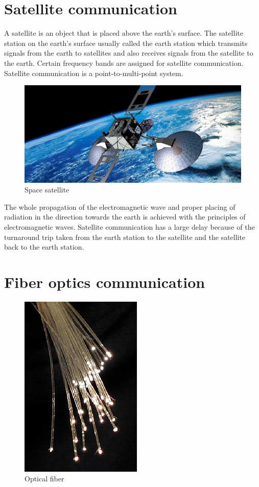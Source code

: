 \section{Satellite communication}
A satellite is an object that is placed above the earth's surface. The satellite station on the earth's surface usually called the earth station which transmits signals from the earth to satellites and also receives signals from the satellite to the earth. Certain frequency bands are assigned for satellite communication. Satellite communication is a point-to-multi-point system.
\begin{figure}[h]
\centering
\includegraphics[scale=0.2]{./graphics/satellite}
\caption{Space satellite}
\end{figure}

The whole propagation of the electromagnetic wave and proper placing of radiation in the direction towards the earth is achieved with the principles of electromagnetic waves. Satellite communication has a large delay because of the turnaround trip taken from the earth station to the satellite and the satellite back to the earth station.

\section{Fiber optics communication}
\begin{figure}[h]
\centering
\includegraphics[scale=0.4]{./graphics/opticalfiber1}
\caption{Optical fiber}
\end{figure}

